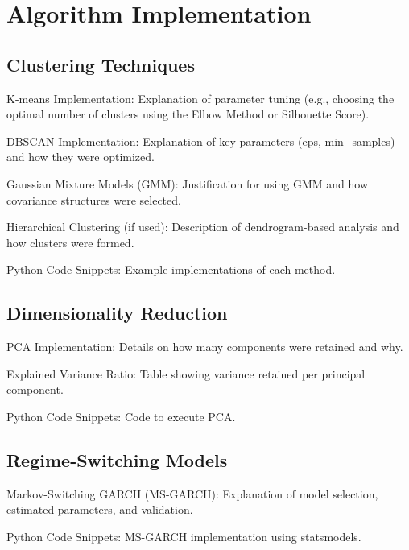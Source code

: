 \label{sec:session}
\chapter{Algorithm Implementation}

\section{Clustering Techniques}

K-means Implementation: Explanation of parameter tuning (e.g., choosing the optimal number of clusters using the Elbow Method or Silhouette Score).

DBSCAN Implementation: Explanation of key parameters (eps, min\_samples) and how they were optimized.

Gaussian Mixture Models (GMM): Justification for using GMM and how covariance structures were selected.

Hierarchical Clustering (if used): Description of dendrogram-based analysis and how clusters were formed.

Python Code Snippets: Example implementations of each method.

\section{Dimensionality Reduction}

PCA Implementation: Details on how many components were retained and why.

Explained Variance Ratio: Table showing variance retained per principal component.

Python Code Snippets: Code to execute PCA.

\section{Regime-Switching Models}

Markov-Switching GARCH (MS-GARCH): Explanation of model selection, estimated parameters, and validation.

Python Code Snippets: MS-GARCH implementation using statsmodels.


